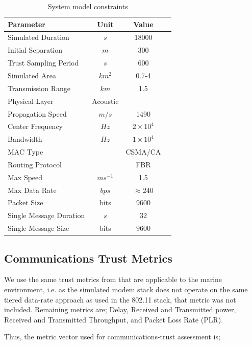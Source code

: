 \documentclass{aamas2016}
\begin{document}
%
\begin{table}[h]
	\caption{System model constraints} \label{tab:sysconstraints}
	\begin{center}
		\setlength{\tabcolsep}{8pt}
		\begin{tabular}{lccc}
			\hline
			Parameter & Unit & Value \\
			\hline
			Simulated Duration & $s$ & 18000\\
			Initial Separation & $m$ & 300\\
			Trust Sampling Period & $s$ & 600 \\
			Simulated Area & $km^2$ &  0.7-4 \\
			Transmission Range & $km$ & 1.5 \\
			Physical Layer & Acoustic\\
			Propagation Speed& $m/s$ & 1490\\
			Center Frequency& $Hz$ & $2 \times 10^4$ \\
			Bandwidth& $Hz$ & $1\times10^4$\\
			MAC Type & & CSMA/CA\\
			Routing Protocol & & FBR \\
			Max Speed & $ms^{-1}$ & 1.5 \\
			Max Data Rate & $bps$ & $\approx 240$ \\
			Packet Size & bits &  9600 \\
			Single Message Duration & $s$ & 32 \\
			Single Message Size & bits & $9600$ \\
			\hline
		\end{tabular}
		\setlength{\tabcolsep}{6pt}
	\end{center}
\end{table}
%

\subsection{Communications Trust Metrics}

We use the same trust metrics from \cite{Guo2012} that are applicable to the marine environment, i.e. as the simulated modem stack does not operate on the same tiered data-rate approach as used in the 802.11 stack, that metric was not included. Remaining metrics are; Delay, Received and Transmitted power, Received and Transmitted Throughput, and Packet Loss Rate (PLR).

Thus, the metric vector used for communications-trust assessment is;
\end{document}

